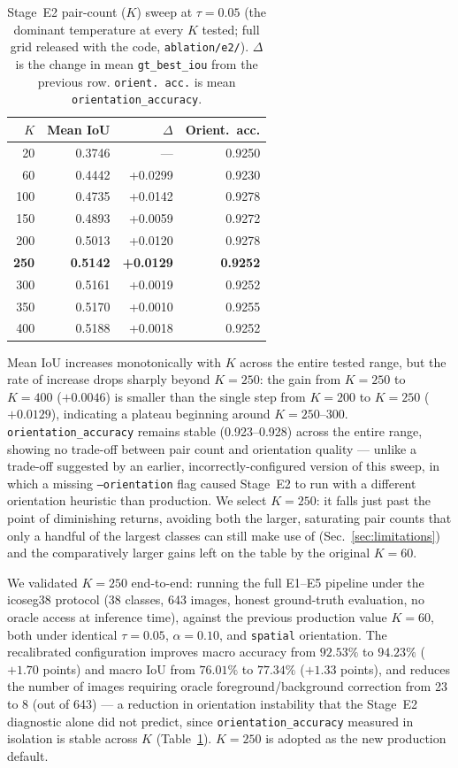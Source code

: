 \begin{table}[t]
\centering
\caption{Stage~E2 pair-count ($K$) sweep at $\tau=0.05$ (the dominant
temperature at every $K$ tested; full grid released with the code,
\texttt{ablation/e2/}). $\Delta$ is the change in mean
\texttt{gt\_best\_iou} from the previous row. \texttt{orient.\ acc.} is
mean \texttt{orientation\_accuracy}.}
\label{tab:e2-topk-sweep}
\begin{tabular}{@{}rrrr@{}}
\toprule
\textbf{$K$} & \textbf{Mean IoU} & \textbf{$\Delta$} & \textbf{Orient.\ acc.} \\
\midrule
20  & 0.3746 & ---     & 0.9250 \\
60  & 0.4442 & +0.0299 & 0.9230 \\
100 & 0.4735 & +0.0142 & 0.9278 \\
150 & 0.4893 & +0.0059 & 0.9272 \\
200 & 0.5013 & +0.0120 & 0.9278 \\
\textbf{250} & \textbf{0.5142} & \textbf{+0.0129} & \textbf{0.9252} \\
300 & 0.5161 & +0.0019 & 0.9252 \\
350 & 0.5170 & +0.0010 & 0.9255 \\
400 & 0.5188 & +0.0018 & 0.9252 \\
\bottomrule
\end{tabular}
\end{table}

Mean IoU increases monotonically with $K$ across the entire tested
range, but the rate of increase drops sharply beyond $K=250$: the gain
from $K=250$ to $K=400$ ($+0.0046$) is smaller than the single step
from $K=200$ to $K=250$ ($+0.0129$), indicating a plateau beginning
around $K=250$--$300$. \texttt{orientation\_accuracy} remains stable
(0.923--0.928) across the entire range, showing no trade-off between
pair count and orientation quality --- unlike a trade-off suggested by
an earlier, incorrectly-configured version of this sweep, in which a
missing \texttt{--orientation} flag caused Stage~E2 to run with a
different orientation heuristic than production. We select $K=250$: it
falls just past the point of diminishing returns, avoiding both the
larger, saturating pair counts that only a handful of the largest
classes can still make use of (Sec.~\ref{sec:limitations}) and the
comparatively larger gains left on the table by the original $K=60$.

We validated $K=250$ end-to-end: running the full E1--E5 pipeline under
the icoseg38 protocol (38 classes, 643 images, honest ground-truth
evaluation, no oracle access at inference time), against the previous
production value $K=60$, both under identical $\tau=0.05$,
$\alpha=0.10$, and \texttt{spatial} orientation. The recalibrated
configuration improves macro accuracy from $92.53\%$ to $94.23\%$
($+1.70$ points) and macro IoU from $76.01\%$ to $77.34\%$ ($+1.33$
points), and reduces the number of images requiring oracle
foreground/background correction from 23 to 8 (out of 643) --- a
reduction in orientation instability that the Stage~E2 diagnostic alone
did not predict, since \texttt{orientation\_accuracy} measured in
isolation is stable across $K$ (Table~\ref{tab:e2-topk-sweep}). $K=250$
is adopted as the new production default.


